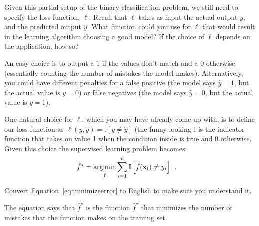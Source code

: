 \documentclass[assignment03_Solutions]{subfiles}
\begin{document}
\begin{exercise}[(10 minutes)]
\bes
\item Given this partial setup of the binary classification problem, we still need to specify the loss function, $\ell$.  Recall that $\ell$ takes as input the actual output $y$, and the predicted output $\hat{y}$.  What function could you use for $\ell$ that would result in the learning algorithm choosing a good model?  If the choice of $\ell$ depends on the application, how so?

\begin{boxedsolution}
An easy choice is to output a $1$ if the values don't match and a $0$ otherwise (essentially counting the number of mistakes the model makes).  Alternatively, you could have different penalties for a false positive (the model says $\hat{y} = 1$, but the actual value is $y = 0$) or false negatives (the model says $\hat{y} = 0$, but the actual value is $y = 1$). 
\end{boxedsolution}

\item \label{ex:minmistakes}
One natural choice for $\ell$, which you may have already come up with, is to define our loss function as $\ell(y, \hat{y}) = \mathbb{I}[y \neq \hat{y}]$ (the funny looking $\mathbb{I}$ is the indicator function that takes on value 1 when the condition inside is true and 0 otherwise.  Given this choice the supervised learning problem becomes:
\begin{align}
\hat{f}^\star &= \operatorname*{arg\,min}_{\hat{f}} \sum_{i=1}^n \mathbb{I} \left [  \hat{f}(\mathbf{x_i}) \neq y_i\right ] \enspace . \label{eq:minimizeerror}
\end{align}

Convert Equation~\ref{eq:minimizeerror} to English to make sure you understand it.
\begin{boxedsolution}
The equation says that $\hat{f}^\star$ is the function $\hat{f}^\star$ that minimizes the number of mistakes that the function makes on the training set.
\end{boxedsolution}

\ees

\end{exercise}
\end{document}
